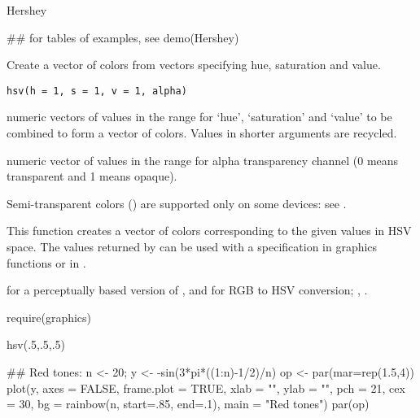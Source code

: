 %
\begin{Examples}
\begin{ExampleCode}
Hershey

## for tables of examples, see demo(Hershey)
\end{ExampleCode}
\end{Examples}
%
\begin{Description}\relax
Create a vector of colors from vectors specifying hue, saturation and
value.
\end{Description}
%
\begin{Usage}
\begin{verbatim}
hsv(h = 1, s = 1, v = 1, alpha)
\end{verbatim}
\end{Usage}
%
\begin{Arguments}
\begin{ldescription}
\item[\code{h,s,v}] numeric vectors of values in the range \code{[0, 1]} for
`hue', `saturation' and `value' to be combined
to form a vector of colors.  Values in shorter arguments are
recycled.
\item[\code{alpha}] numeric vector of values in the range \code{[0, 1]} for
alpha transparency channel (0 means transparent and 1 means opaque).
\end{ldescription}
\end{Arguments}
%
\begin{Details}\relax
Semi-transparent colors () are supported only on
some devices: see .
\end{Details}
%
\begin{Value}
This function creates a vector of colors corresponding to the
given values in HSV space.  The values returned by  can be
used with a  specification in graphics functions or in
.
\end{Value}
%
\begin{SeeAlso}\relax
{} for a perceptually based version of ,
 and  for RGB to HSV conversion;
,
.
\end{SeeAlso}
%
\begin{Examples}
\begin{ExampleCode}
require(graphics)

hsv(.5,.5,.5)

## Red tones:
n <- 20;  y <- -sin(3*pi*((1:n)-1/2)/n)
op <- par(mar=rep(1.5,4))
plot(y, axes = FALSE, frame.plot = TRUE,
     xlab = "", ylab = "", pch = 21, cex = 30,
     bg = rainbow(n, start=.85, end=.1),
     main = "Red tones")
par(op)
\end{ExampleCode}
\end{Examples}
